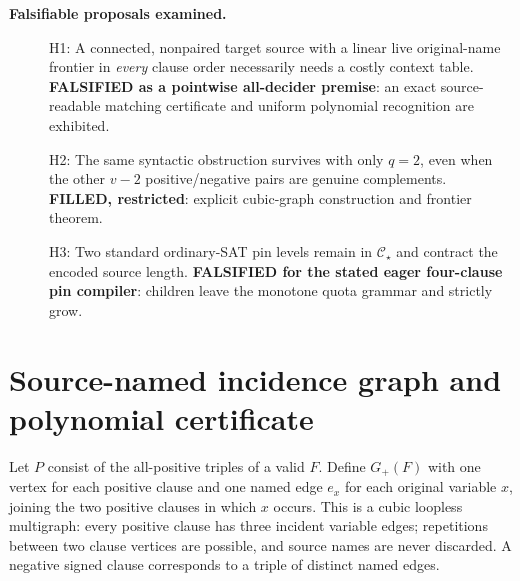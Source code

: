 \documentclass[11pt]{article}
\newcommand{\CS}{\mathcal C_\star}
\begin{document}
\noindent\textbf{Falsifiable proposals examined.}
\begin{description}
\item[] H1: A connected, nonpaired target source with a linear live original-name frontier in \emph{every} clause order necessarily needs a costly context table. \textbf{FALSIFIED as a pointwise all-decider premise}: an exact source-readable matching certificate and uniform polynomial recognition are exhibited.
\item[] H2: The same syntactic obstruction survives with only $q=2$, even when the other $v-2$ positive/negative pairs are genuine complements. \textbf{FILLED, restricted}: explicit cubic-graph construction and frontier theorem.
\item[] H3: Two standard ordinary-SAT pin levels remain in $\CS$ and contract the encoded source length. \textbf{FALSIFIED for the stated eager four-clause pin compiler}: children leave the monotone quota grammar and strictly grow.
\end{description}

\section{Source-named incidence graph and polynomial certificate}
Let $P$ consist of the all-positive triples of a valid $F$. Define $G_+(F)$ with one vertex for each positive clause and one named edge $e_x$ for each original variable $x$, joining the two positive clauses in which $x$ occurs. This is a cubic loopless multigraph: every positive clause has three incident variable edges; repetitions between two clause vertices are possible, and source names are never discarded. A negative signed clause corresponds to a triple of distinct named edges.
\end{document}
